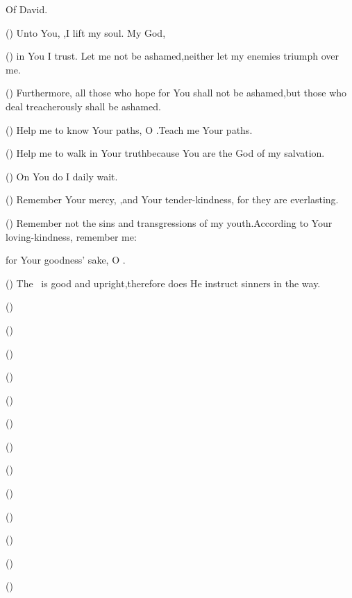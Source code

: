 
\begin{inparaenum}
  \noindent{} Of David.\smallskip%
  
  \pb () Unto You, \lord,\pa I lift my soul.  My God,%
  
  \pb () in You I trust. Let me not be ashamed,\pa neither let my enemies triumph over me.%
  
  \pa {} () Furthermore, all those who hope for You shall not be ashamed,\pa but those who deal treacherously shall be ashamed.%
  
  \pa {} () Help me to know Your paths, O \lord.\pa Teach me Your paths.%
  
  \pa {} () Help me to walk in Your truth\pa because You are the God of my salvation.%
  
  \pb () On You do I daily wait.%
  
  \pa {} () Remember Your mercy, \lord,\pa and Your tender-kindness, for they are everlasting.%
  
  \pa {} () Remember not the sins and transgressions of my youth.\pa According to Your loving-kindness, remember me:%
  
  \pb for Your goodness' sake, O \lord.%
  
  \pa {} () The \lord\ is good and upright,\pa therefore does He instruct sinners in the way.%
  
  \pa {} () %
  
  \pa {} () %
  
  \pa {} () %
  
  \pa {} () %
  
  \pa {} () %
  
  \pa {} () %
  
  \pa {} () %
  
  \pa {} () %
  
  \pa {} () %
  
  \pa {} (\Hebrew{}) %
  
  \pa {} () %
  
  \pa {} () %
  
  \pa {} () %
  
  \pa {} %
\end{inparaenum}
